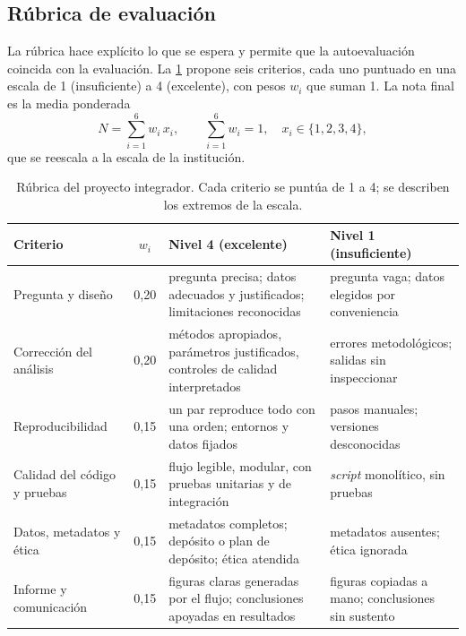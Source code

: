 \subsection{Rúbrica de evaluación}

La rúbrica hace explícito lo que se espera y permite que la autoevaluación coincida con la evaluación. La \cref{tab:18-rubrica} propone seis criterios, cada uno puntuado en una escala de 1 (insuficiente) a 4 (excelente), con pesos $w_i$ que suman 1. La nota final es la media ponderada
\begin{equation}\label{eq:18-nota}
N = \sum_{i=1}^{6} w_i\,x_i, \qquad \sum_{i=1}^{6} w_i = 1,\quad x_i\in\{1,2,3,4\},
\end{equation}
que se reescala a la escala de la institución.

\begin{simbolos}
\end{simbolos}

\begin{table}[t]
\centering
\small
\caption[Rúbrica del proyecto integrador]{Rúbrica del proyecto integrador. Cada criterio se puntúa de 1 a 4; se describen los extremos de la escala.}
\label{tab:18-rubrica}
\begin{tabularx}{\linewidth}{@{}>{\raggedright\arraybackslash}p{2.4cm}c>{\raggedright\arraybackslash}X>{\raggedright\arraybackslash}X@{}}
\toprule
\textbf{Criterio} & $w_i$ & \textbf{Nivel 4 (excelente)} & \textbf{Nivel 1 (insuficiente)}\\
\midrule
Pregunta y diseño & 0,20 & pregunta precisa; datos adecuados y justificados; limitaciones reconocidas & pregunta vaga; datos elegidos por conveniencia\\
Corrección del análisis & 0,20 & métodos apropiados, parámetros justificados, controles de calidad interpretados & errores metodológicos; salidas sin inspeccionar\\
Reproducibilidad & 0,15 & un par reproduce todo con una orden; entornos y datos fijados & pasos manuales; versiones desconocidas\\
Calidad del código y pruebas & 0,15 & flujo legible, modular, con pruebas unitarias y de integración & \emph{script} monolítico, sin pruebas\\
Datos, metadatos y ética & 0,15 & metadatos completos; depósito o plan de depósito; ética atendida & metadatos ausentes; ética ignorada\\
Informe y comunicación & 0,15 & figuras claras generadas por el flujo; conclusiones apoyadas en resultados & figuras copiadas a mano; conclusiones sin sustento\\
\bottomrule
\end{tabularx}
\end{table}


